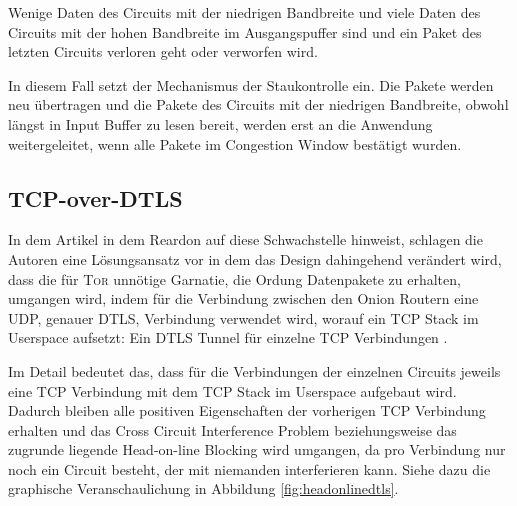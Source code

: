 \documentclass[fleqn,envcountsame,runningheads,10pt,a4paper]{llncs}
\begin{document}
Wenige Daten des Circuits mit der niedrigen Bandbreite und viele Daten des Circuits mit der hohen Bandbreite im Ausgangspuffer sind und ein Paket des letzten Circuits verloren geht oder verworfen wird.


In diesem Fall setzt der Mechanismus der Staukontrolle ein.
Die Pakete werden neu übertragen und die Pakete des Circuits mit der niedrigen Bandbreite, obwohl längst in Input Buffer zu lesen bereit, werden erst an die Anwendung weitergeleitet, wenn alle Pakete im Congestion Window bestätigt wurden.

\begin{figure}[htc]
\end{figure}

\subsection{TCP-over-DTLS}
\label{sec:DTLSrealtedwork}

In dem Artikel in dem Reardon auf diese Schwachstelle hinweist, schlagen die Autoren eine Lösungsansatz vor in dem das Design dahingehend verändert wird, dass die für \textsc{Tor} unnötige Garnatie, die Ordung Datenpakete zu erhalten, umgangen wird, indem für die Verbindung zwischen den Onion Routern eine UDP, genauer DTLS, Verbindung verwendet wird, worauf ein TCP Stack im Userspace aufsetzt: Ein DTLS Tunnel für einzelne TCP Verbindungen \cite{tcp-over-dtls}.

Im Detail bedeutet das, dass für die Verbindungen der einzelnen Circuits jeweils eine TCP Verbindung mit dem TCP Stack im Userspace aufgebaut wird. Dadurch bleiben alle positiven Eigenschaften der vorherigen TCP Verbindung erhalten und das Cross Circuit Interference Problem beziehungsweise das zugrunde liegende Head-on-line Blocking wird umgangen, da pro Verbindung nur noch ein Circuit besteht, der mit niemanden interferieren kann. Siehe dazu die graphische Veranschaulichung in Abbildung \ref{fig:headonlinedtls}.
\end{document}
